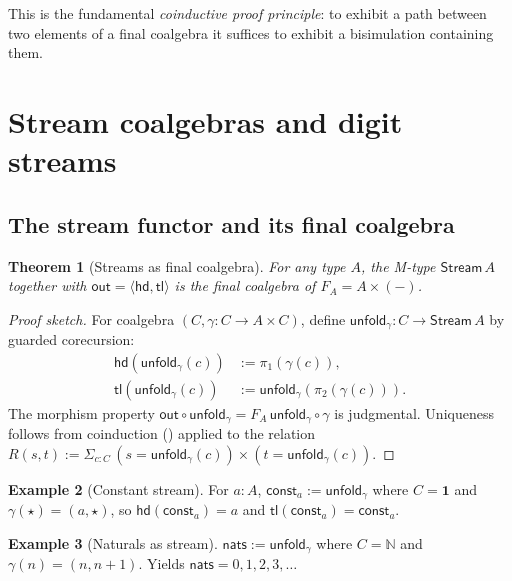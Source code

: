 \documentclass[12pt]{article}
\newtheorem{theorem}{Theorem}[section]
\theoremstyle{definition}
\newtheorem{example}[theorem]{Example}
\theoremstyle{remark}
\newcommand{\N}{\mathbb{N}}
\newcommand{\Stream}{\mathsf{Stream}}
\newcommand{\hd}{\mathsf{hd}}
\newcommand{\tl}{\mathsf{tl}}
\newcommand{\out}{\mathsf{out}}
\newcommand{\unfold}{\mathsf{unfold}}
\begin{document}
This is the fundamental \emph{coinductive proof principle}: to
exhibit a path between two elements of a final coalgebra it
suffices to exhibit a bisimulation containing them.

\section{Stream coalgebras and digit streams}\label{sec:streams}

\subsection{The stream functor and its final coalgebra}

\begin{theorem}[Streams as final coalgebra]\label{thm:streamfinal}
For any type $A$, the M-type $\Stream\,A$ together with
$\out = \langle\hd,\tl\rangle$ is the final coalgebra of
$F_A = A\times(-)$.
\end{theorem}

\begin{proof}[Proof sketch]
For coalgebra $(C,\gamma:C\to A\times C)$, define
$\unfold_\gamma: C \to \Stream\,A$ by guarded corecursion:
\begin{align*}
\hd(\unfold_\gamma(c)) &:= \pi_1(\gamma(c)),\\
\tl(\unfold_\gamma(c)) &:= \unfold_\gamma(\pi_2(\gamma(c))).
\end{align*}
The morphism property $\out \circ \unfold_\gamma = F_A\,\unfold_\gamma \circ \gamma$
is judgmental. Uniqueness follows from coinduction
() applied to the relation $R(s,t) :=
\Sigma_{c:C}\,(s = \unfold_\gamma(c))\times(t = \unfold_\gamma(c))$.
\end{proof}

\begin{example}[Constant stream]
For $a:A$, $\mathsf{const}_a := \unfold_\gamma$ where $C = \mathbf{1}$
and $\gamma(\star) = (a,\star)$, so
$\hd(\mathsf{const}_a) = a$ and $\tl(\mathsf{const}_a) = \mathsf{const}_a$.
\end{example}

\begin{example}[Naturals as stream]
$\mathsf{nats} := \unfold_\gamma$ where $C = \N$ and
$\gamma(n) = (n, n+1)$. Yields $\mathsf{nats} = 0,1,2,3,\dots$
\end{example}
\end{document}

